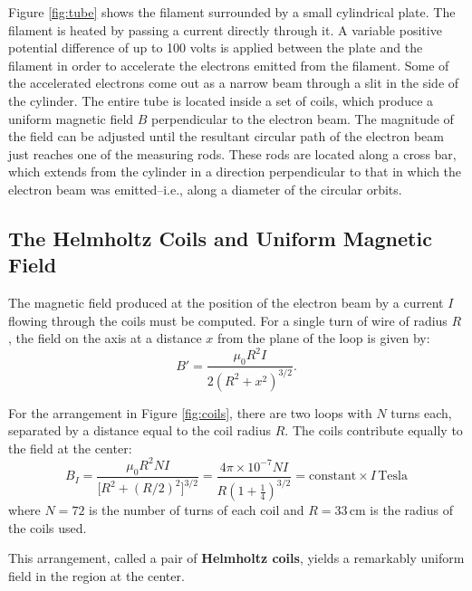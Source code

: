 Figure {\ref{fig:tube}} shows the filament surrounded by a small cylindrical plate. The filament is heated by passing a current directly through it. A variable positive potential difference of up to 100 volts is applied between the plate and the filament in order to accelerate the electrons emitted from the filament. Some of the accelerated electrons come out as a narrow beam through a slit in the side of the cylinder. The entire tube is located inside a set of coils, which produce a uniform magnetic field $B$ perpendicular to the electron beam. The magnitude of the field can be adjusted until the resultant circular path of the electron beam just reaches one of the measuring rods. These rods are located along a cross bar, which extends from the cylinder in a direction perpendicular to that in which the electron beam was emitted--i.e., along a diameter of the circular orbits.

\subsection{The Helmholtz Coils and Uniform Magnetic Field}
The magnetic field produced at the position of the electron beam by a current $I$ flowing through the coils must be computed. For a single turn of wire of radius $R$, the field on the axis at a distance $x$ from the plane of the loop is given by:
\begin{equation}
  B'=\frac{\mu_{0}R^{2}I}{2(R^2+x^2)^{3/2}}.
\end{equation}

For the arrangement in Figure {\ref{fig:coils}}, there are two loops with $N$ turns each, separated by a distance equal to the coil radius $R$. The coils contribute equally to the field at the center:
\begin{equation}
  B_{I}=\frac{\mu_{0}R^2NI}{\big[R^2+(R/2)^2\big]^{3/2}}=\frac{4\pi\times 10^{-7}NI}{R(1+\frac{1}{4})^{3/2}}=\mathrm{constant}\times I\, \mathrm{Tesla}
\label{eq:bi}
\end{equation}
where $N = 72$ is the number of turns of each coil and $R = 33\, \mathrm{cm}$ is the radius of the coils used.\myskip

This arrangement, called a pair of \textbf{Helmholtz coils}, yields a remarkably uniform field in the region at the center.\myskip


